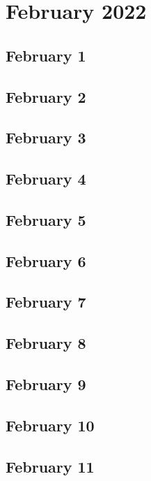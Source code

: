 \chapter{February 2022}

\section{February 1}

\section{February 2}

\section{February 3}

\section{February 4}

\section{February 5}

\section{February 6}

\section{February 7}

\section{February 8}

\section{February 9}

\section{February 10}

\section{February 11}

